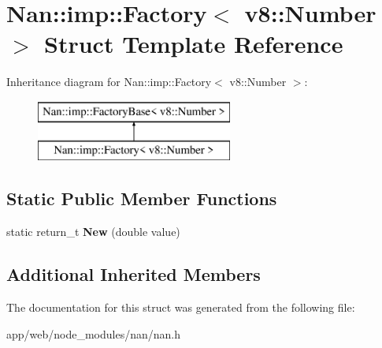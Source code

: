 \hypertarget{struct_nan_1_1imp_1_1_factory_3_01v8_1_1_number_01_4}{}\section{Nan\+:\+:imp\+:\+:Factory$<$ v8\+:\+:Number $>$ Struct Template Reference}
\label{struct_nan_1_1imp_1_1_factory_3_01v8_1_1_number_01_4}
Inheritance diagram for Nan\+:\+:imp\+:\+:Factory$<$ v8\+:\+:Number $>$\+:\begin{figure}[H]
\begin{center}
\leavevmode
\includegraphics[height=2.000000cm]{struct_nan_1_1imp_1_1_factory_3_01v8_1_1_number_01_4}
\end{center}
\end{figure}
\subsection*{Static Public Member Functions}
\begin{DoxyCompactItemize}
\item 
\mbox{\label{struct_nan_1_1imp_1_1_factory_3_01v8_1_1_number_01_4_ad6ed52c7ee1832797f744f009f33295a}} 
static return\+\_\+t {\bfseries New} (double value)
\end{DoxyCompactItemize}
\subsection*{Additional Inherited Members}


The documentation for this struct was generated from the following file\+:\begin{DoxyCompactItemize}
\item 
app/web/node\+\_\+modules/nan/nan.\+h\end{DoxyCompactItemize}
